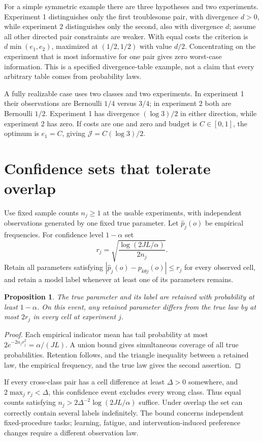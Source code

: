\documentclass[11pt,a4paper]{article}
\newtheorem{proposition}[theorem]{Proposition}
\begin{document}
For a simple symmetric example there are three hypotheses and two experiments. Experiment 1 distinguishes only the first troublesome pair, with divergence $d>0$, while experiment 2 distinguishes only the second, also with divergence $d$; assume all other directed pair constraints are weaker. With equal costs the criterion is $d\min(e_1,e_2)$, maximized at $(1/2,1/2)$ with value $d/2$. Concentrating on the experiment that is most informative for one pair gives zero worst-case information. This is a specified divergence-table example, not a claim that every arbitrary table comes from probability laws.

A fully realizable case uses two classes and two experiments. In experiment 1 their observations are Bernoulli $1/4$ versus $3/4$; in experiment 2 both are Bernoulli $1/2$. Experiment 1 has divergence $(\log3)/2$ in either direction, while experiment 2 has zero. If costs are one and zero and budget is $C\in[0,1]$, the optimum is $e_1=C$, giving $\mathcal J=C(\log3)/2$.
\section{Confidence sets that tolerate overlap}
Use fixed sample counts $n_j\ge1$ at the usable experiments, with independent observations generated by one fixed true parameter. Let $\widehat p_j(o)$ be empirical frequencies. For confidence level $1-\alpha$ set
\[
 r_j=\sqrt{\frac{\log(2JL/\alpha)}{2n_j}}.
\]
Retain all parameters satisfying
$|\widehat p_j(o)-p_{k\theta j}(o)|\le r_j$ for every observed cell, and retain a model label whenever at least one of its parameters remains.
\begin{proposition}
The true parameter and its label are retained with probability at least $1-\alpha$. On this event, any retained parameter differs from the true law by at most $2r_j$ in every cell at experiment $j$.
\end{proposition}
\begin{proof}
Each empirical indicator mean has tail probability at most $2e^{-2n_jr_j^2}=\alpha/(JL)$. A union bound gives simultaneous coverage of all true probabilities. Retention follows, and the triangle inequality between a retained law, the empirical frequency, and the true law gives the second assertion.
\end{proof}
If every cross-class pair has a cell difference at least $\Delta>0$ somewhere, and $2\max_jr_j<\Delta$, this confidence event excludes every wrong class. Thus equal counts satisfying
$n_j>2\Delta^{-2}\log(2JL/\alpha)$ suffice. Under overlap the set can correctly contain several labels indefinitely. The bound concerns independent fixed-procedure tasks; learning, fatigue, and intervention-induced preference changes require a different observation law.
\end{document}
